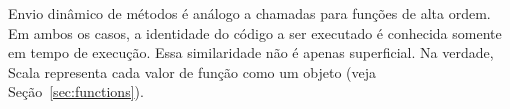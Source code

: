 Envio din\^{a}mico de m\'{e}todos \'{e} an\'{a}logo a chamadas para fun\c{c}\~{o}es de alta ordem. 
Em ambos os casos, a identidade do c\'{o}digo  a ser executado \'{e} conhecida somente
em tempo de execu\c{c}\~{a}o. Essa similaridade n\~{a}o \'{e} apenas superficial. Na verdade, 
Scala representa cada valor de fun\c{c}\~{a}o como um objeto (veja Se\c{c}\~{a}o~\ref{sec:functions}).

